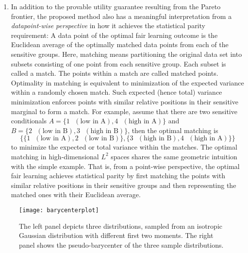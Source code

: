 \documentclass[twoside,11pt]{article}
\newcommand{\edit}[1]{\textcolor{blue}{#1}}
\begin{document}
\begin{enumerate}
\item In addition to the provable utility guarantee resulting from the Pareto frontier, the proposed method also has a meaningful interpretation from a {\em datapoint-wise perspective} in how it achieves the statistical parity requirement: A data point of the optimal fair learning outcome is the Euclidean average of the optimally matched data points from each of the sensitive groups. Here, matching means partitioning the original data set into subsets consisting of one point from each sensitive group. Each subset is called a match. The points within a match are called matched points. Optimality in matching is equivalent to minimization of the expected variance within a randomly chosen match. Such expected (hence total) variance minimization enforces points with similar relative positions in their sensitive marginal to form a match. For example, assume that there are two sensitive conditionals $A = \{1 \text{ } (\text{low in A}),4 \text{ } (\text{high in A})\}$ and $B = \{2 \text{ } (\text{low in B}),3 \text{ } (\text{high in B})\}$, then the optimal matching is $$\{ \{1 \text{ } (\text{low in A}),2 \text{ } (\text{low in B})\}, \{3 \text{ } (\text{high in B}),4 \text{ } (\text{high in A})\} \}$$ to minimize the expected or total variance within the matches. The optimal matching in high-dimensional $L^2$ spaces shares the same geometric intuition with the simple example. That is, from a point-wise perspective, the optimal fair learning achieves statistical parity by first matching the points with similar relative positions in their sensitive groups and then representing the matched ones with their Euclidean average.

\end{enumerate}

\begin{figure}[H]
\centering
\texttt{[image: barycenterplot]}
\caption{The left panel depicts three distributions, sampled from an isotropic Gaussian distribution with different first two moments. The right panel shows the pseudo-barycenter of the three sample distributions.}
\label{figure:k-means on barycenter}
\end{figure}
\end{document}
